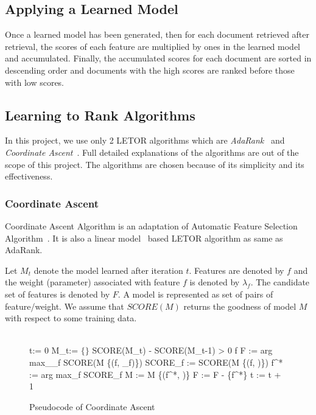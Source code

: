 \subsection{Applying a Learned Model}\label{sec:background_applyLearnedModel}
Once a learned model has been generated, then for each document retrieved after retrieval, 
the scores of each feature are multiplied by ones in the learned model and accumulated.
Finally, the accumulated scores for each document are sorted in descending order and documents with the high scores are ranked before
those with low scores.

\subsection{Learning to Rank Algorithms}
In this project, we use only 2 LETOR algorithms which are \textit{AdaRank}~\cite[P. 60]{letorBook} and \textit{Coordinate Ascent}~\cite{caAlg}. Full detailed explanations of the algorithms 
are out of the scope of this project. The algorithms are chosen because of its simplicity and its effectiveness.

\subsubsection{Coordinate Ascent}
Coordinate Ascent Algorithm is an adaptation of Automatic Feature Selection Algorithm~\cite{caAlg}. It is also a linear model~\cite[P. 1-4]{mlSimon} 
based LETOR algorithm as same as AdaRank.

Let $M_t$ denote the model learned after iteration $t$. Features are denoted by $f$ and the weight (parameter) associated with feature $f$ is 
denoted by $\lambda_f$. The candidate set of features is denoted by $F$. A model is represented as set of pairs of feature/weight. We assume that
$SCORE(M)$ returns the goodness of model $M$ with respect to some training data.
\begin{figure}
\begin{program}
\BEGIN \\
  t:= 0
  M_t:= $\{\}$
  \WHILE SCORE(M_t) - SCORE(M_{t-1}) > 0 \DO
    \FOR f \in F \DO
      \hat{\lambda} := arg max_{\lambda_f} SCORE(M \cup \{(f, \lambda_f)\}) 
      SCORE_f := SCORE(M \cup \{(f, )\})
    \END
  f^* := arg max_f SCORE_f
  M := M \cup \{(f^*, )\}
  F := F - \{f^*\}
  t := t + 1
  \END
\END
\end{program}
\caption{Pseudocode of Coordinate Ascent}\label{fig:caAlg}
\end{figure}


